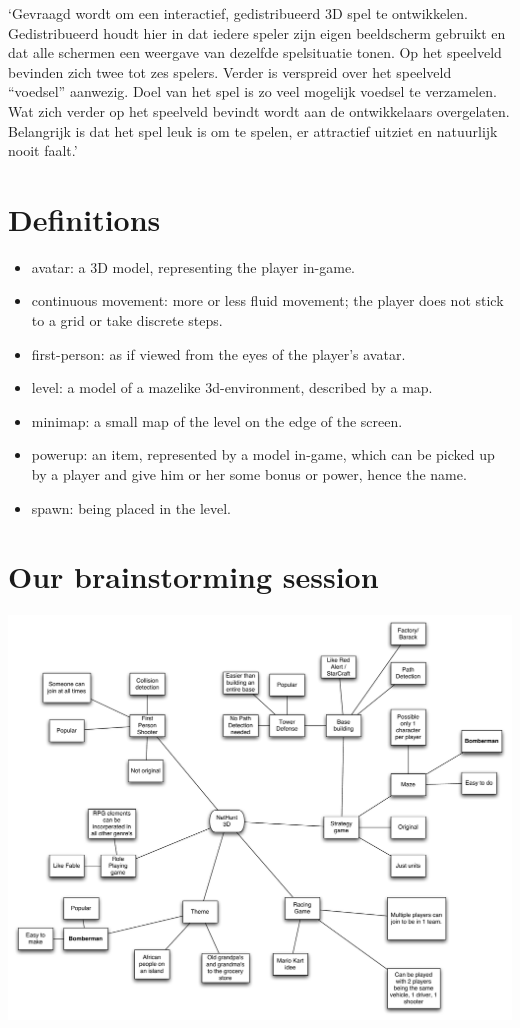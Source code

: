 \documentclass[a4paper,twoside,11pt]{report}
\begin{document}
`Gevraagd wordt om een interactief, gedistribueerd 3D spel te
ontwikkelen. Gedistribueerd houdt hier in dat iedere speler zijn eigen
beeldscherm gebruikt en dat alle schermen een weergave van dezelfde
spelsituatie tonen. Op het speelveld bevinden zich twee tot zes spelers.
Verder is verspreid over het speelveld ``voedsel'' aanwezig. Doel van het
spel is zo veel mogelijk voedsel te verzamelen. Wat zich verder op het
speelveld bevindt wordt aan de ontwikkelaars overgelaten. Belangrijk is
dat het spel leuk is om te spelen, er attractief uitziet en natuurlijk nooit
faalt.'

\chapter{Definitions}
\label{cha:defs}
\begin{itemize}
  \item avatar: a 3D model, representing the player in-game.
  \item continuous movement: more or less fluid movement; the player does not stick to a grid or take discrete steps.
  \item first-person: as if viewed from the eyes of the player's avatar.
  \item level: a model of a mazelike 3d-environment, described by a map.
  \item minimap: a small map of the level on the edge of the screen.
  \item powerup: an item, represented by a model in-game, which can be picked up by a player and give him or her some bonus or power, hence the name.
  \item spawn: being placed in the level.
\end{itemize}

\chapter{Our brainstorming session}

\includegraphics[width=\textwidth]{mindmap}
\end{document}
